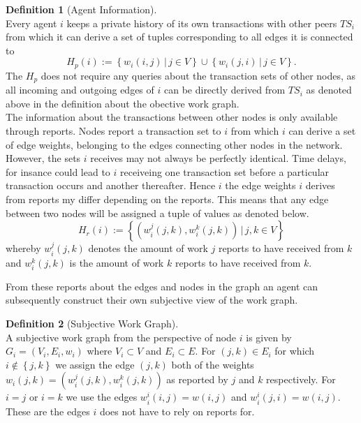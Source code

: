 \documentclass[11pt,a4paper]{article}
\theoremstyle{definition}
\newtheorem{definition}{Definition}[section]
\theoremstyle{theorem}
\theoremstyle{proposition}
\theoremstyle{corollary}
\theoremstyle{lemma}
\theoremstyle{example}
\theoremstyle{remark}
\begin{document}
\begin{definition}[Agent Information]\ \\
Every agent $i$ keeps a private history of its own transactions with other peers $TS_i$ from which it can derive a set of tuples corresponding to all edges it is connected to
\[
H_p(i):=\left\lbrace{}w_i(i,j)\,|\, j\in{}V\right\rbrace \cup \left\lbrace{}w_i(j,i)\,|\, j\in{}V\right\rbrace .
\]
\noindent{}The $H_p$ does not require any queries about the transaction sets of other nodes, as all incoming and outgoing edges of $i$ can be directly derived from $TS_i$ as denoted above in the definition about the obective work graph. \vspace{1em}\\

\noindent{}The information about the transactions between other nodes is only available through reports. Nodes report a transaction set to $i$ from which $i$ can derive a set of edge weights, belonging to the edges connecting other nodes in the network. However, the sets $i$ receives may not always be perfectly identical. Time delays, for insance could lead to $i$ receiveing one transaction set before a particular transaction occurs and another thereafter. Hence $i$ the edge weights $i$ derives from reports my differ depending on the reports. This means that any edge between two nodes will be assigned a tuple of values as denoted below.  
\[
H_r(i):=\left\lbrace{}(w_i^j(j,k),w_i^k(j,k))\,|\,j,k\in{}V\right\rbrace
\]
whereby $w_i^j(j,k)$ denotes the amount of work $j$ reports to have received from $k$ and $w_i^k(j,k)$ is the amount of work $k$ reports to have received from $k$. 
\end{definition}

\noindent{}From these reports about the edges and nodes in the graph an agent can subsequently construct their own subjective view of the work graph.

\begin{definition}[Subjective Work Graph]\ \\
A subjective work graph from the perspective of node $i$ is given by $G_i=(V_i,E_i,w_i)$ where $V_i\subset{}V$ and $E_i\subset{}E$. For $(j,k)\in{}E_i$ for which $i\not\in\left\lbrace{}j,k\right\rbrace$ we assign the edge $(j,k)$ both of the weights $w_i(j,k) = (w_i^j(j,k), w_i^k(j,k))$ as reported by $j$ and $k$ respectively. For $i=j$ or $i=k$ we use the edges $w_i^i(i,j)=w(i,j)$ and $w_i^i(j,i)=w(i,j)$. These are the edges $i$ does not have to rely on reports for.  
\end{definition}
\end{document}
